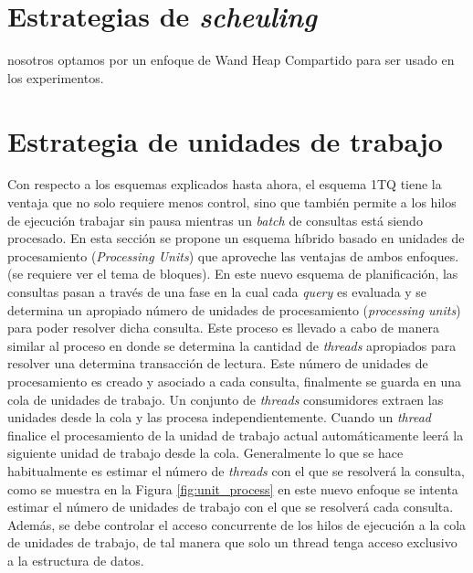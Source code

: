 \section{Estrategias de \textit{scheuling}}
\label{scheduling:es}
nosotros optamos por un enfoque de Wand Heap Compartido para ser usado en los experimentos.





\section{Estrategia de unidades de trabajo}
\label{scheduling:unidadestrabajo}
Con respecto a los esquemas explicados hasta ahora, el esquema 1TQ tiene la ventaja que no solo requiere menos control, sino que también permite a los hilos de ejecución trabajar sin pausa mientras un \textit{batch} de consultas está siendo procesado. En esta sección se propone un esquema híbrido basado en unidades de procesamiento (\textit{Processing Units}) que aproveche las ventajas de ambos enfoques. (se requiere ver el tema de bloques).
En este nuevo esquema de planificación, las consultas pasan a través de una fase en la cual cada \textit{query} es evaluada y se determina un apropiado número de unidades de procesamiento (\textit{processing units}) para poder resolver dicha consulta. Este proceso es llevado a cabo de manera similar al proceso en donde se determina la cantidad de \textit{threads} apropiados para resolver una determina transacción de lectura. Este número de unidades de procesamiento es creado y asociado a cada consulta, finalmente se guarda en una cola de unidades de trabajo. Un conjunto de \textit{threads} consumidores extraen las unidades desde la cola y las procesa independientemente. Cuando un \textit{thread} finalice el procesamiento de la unidad de trabajo actual automáticamente leerá la siguiente unidad de trabajo desde la cola. 
Generalmente lo que se hace habitualmente es estimar el número de \textit{threads} con el que se resolverá la consulta, como se muestra en la Figura \ref{fig:unit_process} en este nuevo enfoque se intenta estimar el número de unidades de trabajo con el que se resolverá cada consulta. Además, se debe controlar el acceso concurrente de los hilos de ejecución a la cola de unidades de trabajo, de tal manera que solo un thread tenga acceso exclusivo a la estructura de datos. 

